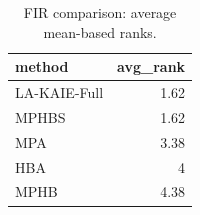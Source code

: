 \begin{table}[t]
\centering
\scriptsize
\caption{FIR comparison: average mean-based ranks.}
\label{tab:fir_comparison_ranks}
\begin{tabular}{lr}
\toprule
method & avg\_rank \\
\midrule
LA-KAIE-Full & 1.62 \\
MPHBS & 1.62 \\
MPA & 3.38 \\
HBA & 4 \\
MPHB & 4.38 \\
\bottomrule
\end{tabular}
\end{table}
